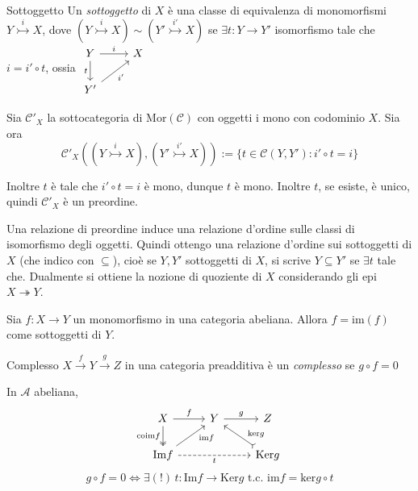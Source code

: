 \begin{definition}{Sottoggetto}
    Un \emph{sottoggetto} di \(X\) è una classe di equivalenza di monomorfismi
    \(Y \overset{i}{\rightarrowtail } X\), dove \({(Y \overset{i}{\rightarrowtail } X)} \sim {(Y' \overset{i'}{\rightarrowtail } X)}\) se \(\exists t : Y \to Y'\) isomorfismo tale che \(i = i' \circ t\), ossia \(\begin{tikzcd}
	Y & X \\
	{Y'}
	\arrow["i", from=1-1, to=1-2]
	\arrow["t"', from=1-1, to=2-1]
	\arrow["{i'}"', from=2-1, to=1-2]
\end{tikzcd}\) 
\end{definition}
\begin{remark}{}
    Sia \(\mathcal{C}'_X\) la sottocategoria di \(\mathrm{Mor}{(\mathcal{C})}\) con oggetti i mono
    con codominio \(X\). Sia ora
    \[
      \mathcal{C}'_X{({(Y \overset{i}{\rightarrowtail  }X)}, {(Y' \overset{i'}{\rightarrowtail  }X)})} := \{t \in \mathcal{C}{(Y, Y')} : i' \circ t = i\} 
    \] %

    Inoltre \(t\) è tale che \(i' \circ t = i\) è mono, dunque \(t\) è mono.
    Inoltre \(t\), se esiste, è unico, quindi \(\mathcal{C}'_X\) è un
    preordine.

    Una relazione di preordine induce una relazione d'ordine sulle classi di
    isomorfismo degli oggetti. Quindi ottengo una relazione d'ordine sui
    sottoggetti di \(X\) (che indico con \(\subseteq \)), cioè se \(Y, Y'\)
    sottoggetti di \(X\), si scrive \(Y \subseteq Y' \) se \(\exists t \) tale
    che. %
    Dualmente si ottiene la nozione di quoziente di \(
    X\) considerando gli epi \(X \twoheadrightarrow  Y\).
\end{remark}
\begin{example}{}
    Sia \(f : X \to 
    Y\) un monomorfismo in una categoria abeliana. Allora \(f = \mathrm{im}{(f)}\) come sottoggetti di \(Y\). %
\end{example}
\begin{definition}{Complesso}
    \(X \overset{f}{\to } Y \overset{g}{\to } Z\) in una categoria preadditiva è
    un \emph{complesso} se \(g \circ f = 0\) 
\end{definition}
\begin{proposition}{}
    In \(\mathcal{A}\) abeliana,
    \[\begin{tikzcd}
	X & Y & Z \\
	{\mathrm{Im}f} && {\mathrm{Ker}g}
	\arrow["f", from=1-1, to=1-2]
	\arrow["{\mathrm{coim}f}"', two heads, from=1-1, to=2-1]
	\arrow["g", from=1-2, to=1-3]
	\arrow["{\mathrm{im}f}"'{pos=0.7}, from=2-1, to=1-2]
	\arrow["t"', dashed, from=2-1, to=2-3]
	\arrow["{\mathrm{ker}g}"'{pos=0.3}, tail, from=2-3, to=1-2]
\end{tikzcd}\]
    \[
      g \circ f = 0 \iff \exists (!)\, t : \mathrm{Im} f \to \mathrm{Ker}g \text{ t.c. } \mathrm{im}f = \mathrm{ker}g \circ t
    \]
\end{proposition}

